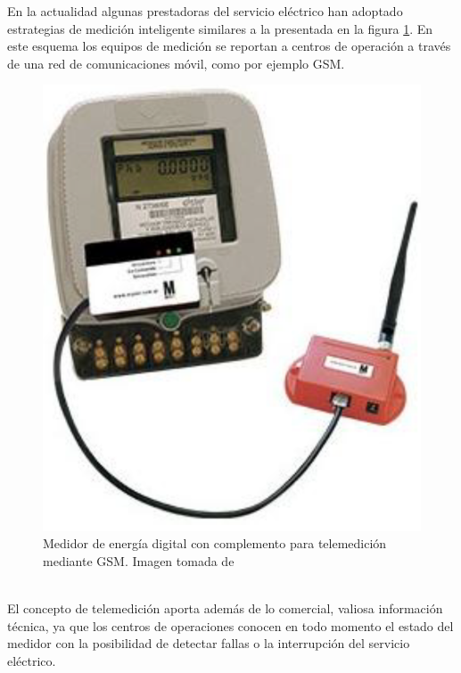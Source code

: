 En la actualidad algunas prestadoras del servicio eléctrico han adoptado estrategias de medición inteligente similares a la presentada en la figura \ref{fig:medidordigitalconcomplementogsm}. En este esquema los equipos de medición se reportan a centros de operación a través de una red de comunicaciones móvil, como por ejemplo GSM.\\
\begin{figure}[h!]
	\centering
	\includegraphics[width=0.4\linewidth]{Figures/medidor_digital_con_complemento_gsm}
	\caption{Medidor de energía digital con complemento para telemedición mediante GSM. Imagen tomada de \citep{MYEEL}}
	\label{fig:medidordigitalconcomplementogsm}
\end{figure}\\
El concepto de telemedición aporta además de lo comercial, valiosa información técnica, ya que los centros de operaciones conocen en todo momento el estado del medidor con la posibilidad de detectar fallas o la interrupción del servicio eléctrico.\\  

